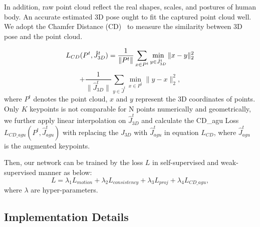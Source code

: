 \documentclass[letterpaper]{article} %
\begin{document}


In addition, raw point cloud reflect the real shapes, scales, and postures of human body. An accurate estimated 3D pose ought to fit the captured point cloud well. We adopt the Chamfer Distance (CD)~\cite{fan2017point} to measure the similarity between 3D pose and the point cloud.


$$
    L_{CD} (P^t,\hat{J}_{3D}^t) = \frac{1}{\|P^t\|}\sum_{x \in P^t}\min_{y \in \hat{J}_{3D}^t}\|x-y\|_{2}^2 \\$$
$$
      +\frac{1}{\|\hat{J}_{3D}^t\|}\sum_{y \in \hat{J}^t}\min_{x \in P^t}\| y-x \|_{2}^2, 
$$
where $P^t$ denotes the point cloud, $x$ and $y$ represent the 3D coordinates of points.
Only $K$ keypoints is not comparable for N points numerically and geometrically, we further apply linear interpolation on $\hat{J}_{3D}^t$ and calculate the CD\_agu Loss $L_{CD\_agu} (P^t,\hat{J}_{agu}^t)$ with replacing the $J_{3D}$ with $\hat{J}_{agu}^t$ in equation $L_{CD}$, where $\hat{J}_{agu}^t$ is the augmented keypoints.

Then, our network can be trained by the loss $L$ in self-supervised and weak-supervised manner as below:
$$L = \lambda_1 L_{motion} + \lambda_2 L_{consistency} + \lambda_3 L_{proj} + \lambda_4 L_{CD\_agu},$$ where $\lambda$ are hyper-parameters.


% 
\subsection{ Implementation Details}
\end{document}
